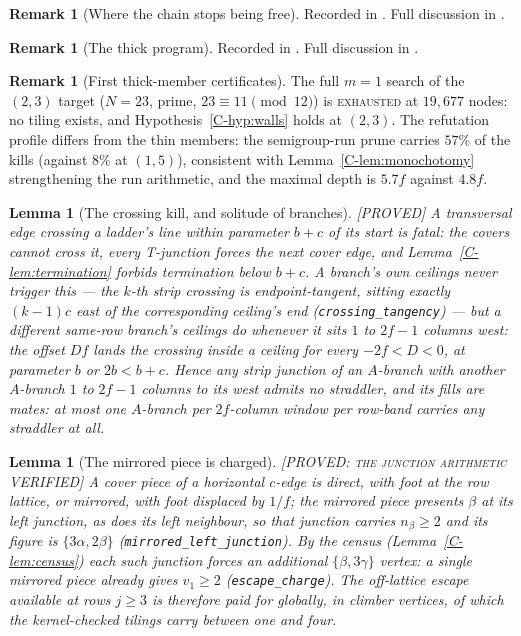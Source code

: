 \documentclass[11pt,reqno]{amsart}
\theoremstyle{plain}
\newtheorem{lemma}[theorem]{Lemma}
\theoremstyle{definition}
\newtheorem{remark}[theorem]{Remark}
\newcommand{\lab}[1]{\hfill\textnormal{\footnotesize\textsc{[#1]}}}
\begin{document}
\begin{remark}[Where the chain stops being free]\label{rem:chainobstruction}
Recorded in \cite{Obstructions}. Full discussion in \cite{Obstructions}.
\end{remark}

\begin{remark}[The thick program]\label{rem:thickprogram}
Recorded in \cite{Obstructions}. Full discussion in \cite{Obstructions}.
\end{remark}

\begin{remark}[First thick-member certificates]\label{rem:thickcerts}
The full $m=1$ search of the $(2,3)$ target ($N=23$, prime, $23\equiv11\pmod{12}$) is
\textsc{exhausted} at $19{,}677$ nodes: no tiling exists, and Hypothesis~\ref{C-hyp:walls} holds at
$(2,3)$. The refutation profile differs from the thin members: the semigroup-run prune carries
$57\%$ of the kills (against $8\%$ at $(1,5)$), consistent with Lemma~\ref{C-lem:monochotomy}
strengthening the run arithmetic, and the maximal depth is $5.7f$ against $4.8f$. \end{remark}

\begin{lemma}[The crossing kill, and solitude of branches]\label{lem:solitary}\lab{PROVED}
A transversal edge crossing a ladder's line within parameter $b+c$ of its start is fatal: the
covers cannot cross it, every T-junction forces the next cover edge, and
Lemma~\ref{C-lem:termination} forbids termination below $b+c$. A branch's own ceilings never
trigger this --- the $k$-th strip crossing is endpoint-tangent, sitting exactly $(k-1)c$ east of
the corresponding ceiling's end (\texttt{crossing\_tangency}) --- but a \emph{different} same-row
branch's ceilings do whenever it sits $1$ to $2f-1$ columns west: the offset $D f$ lands the
crossing inside a ceiling for every $-2f<D<0$, at parameter $b$ or $2b<b+c$. Hence any strip
junction of an $A$-branch with another $A$-branch $1$ to $2f-1$ columns to its west admits no
straddler, and its fills are mates: at most one $A$-branch per $2f$-column window per row-band
carries any straddler at all.
\end{lemma}

\begin{lemma}[The mirrored piece is charged]\label{lem:charge}\lab{PROVED: the junction arithmetic VERIFIED}
A cover piece of a horizontal $c$-edge is direct, with foot at the row lattice, or mirrored, with
foot displaced by $1/f$; the mirrored piece presents $\beta$ at its left junction, as does its
left neighbour, so that junction carries $n_\beta\ge2$ and its figure is $\{3\alpha,2\beta\}$
(\texttt{mirrored\_left\_junction}). By the census (Lemma~\ref{C-lem:census}) each such junction
forces an additional $\{\beta,3\gamma\}$ vertex: a single mirrored piece already gives $v_1\ge2$
(\texttt{escape\_charge}). The off-lattice escape available at rows $j\ge3$ is therefore paid for
globally, in climber vertices, of which the kernel-checked tilings carry between one and four.
\end{lemma}
\end{document}
